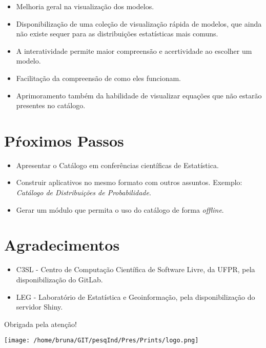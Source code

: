 \begin{frame}

\begin{itemize}
\tightlist
\item
  Melhoria geral na visualização dos modelos.
\item
  Disponibilização de uma coleção de visualização rápida de modelos, que
  ainda não existe sequer para as distribuições estatísticas mais
  comuns.
\item
  A interatividade permite maior compreensão e acertividade ao escolher
  um modelo.
\item
  Facilitação da compreensão de como eles funcionam.
\item
  Aprimoramento também da habilidade de visualizar equações que não
  estarão presentes no catálogo.
\end{itemize}

\end{frame}

\section{Pŕoximos Passos}\label{proximos-passos}

\begin{frame}

\begin{itemize}
\tightlist
\item
  Apresentar o Catálogo em conferências científicas de Estatística.
\item
  Construir aplicativos no mesmo formato com outros assuntos. Exemplo:
  \emph{Catálogo de Distribuições de Probabilidade}.
\item
  Gerar um módulo que permita o uso do catálogo de forma \emph{offline}.
\end{itemize}

\end{frame}

\section{Agradecimentos}\label{agradecimentos}

\begin{frame}

\begin{itemize}
\tightlist
\item
  C3SL - Centro de Computação Científica de Software Livre, da UFPR,
  pela disponibilização do GitLab.
\item
  LEG - Laboratório de Estatística e Geoinformação, pela
  disponibilização do servidor Shiny.
\end{itemize}

\end{frame}

\begin{frame}

\begin{center}

\Huge Obrigada pela atenção!

\vspace{0.5cm}
\texttt{[image: /home/bruna/GIT/pesqInd/Pres/Prints/logo.png]}

\end{center}

\end{frame}
